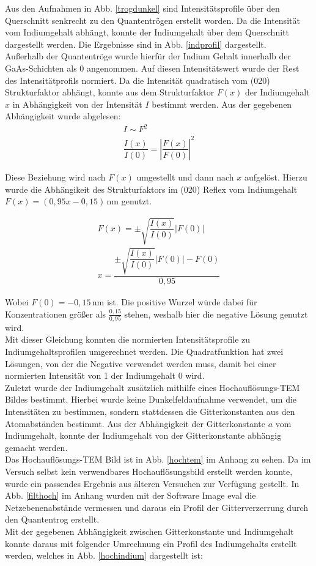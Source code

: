 \documentclass[a4paper,11pt,DIV=11]{scrartcl}
\begin{document}
Aus den Aufnahmen in Abb. \ref{trogdunkel} sind Intensitätsprofile über den Querschnitt senkrecht zu den Quantentrögen erstellt worden. Da die Intensität vom Indiumgehalt abhängt, konnte der Indiumgehalt über dem Querschnitt dargestellt werden. Die Ergebnisse sind in Abb. \ref{indprofil} dargestellt. \\
Außerhalb der Quantentröge wurde hierfür der Indium Gehalt innerhalb der GaAs-Schichten als 0 angenommen. Auf diesen Intensitätswert wurde der Rest des Intensitätprofils normiert. Da die Intensität quadratisch vom (020) Strukturfaktor abhängt, konnte aus dem Strukturfaktor $F(x)$ der Indiumgehalt $x$ in Abhängigkeit von der Intensität $I$ bestimmt werden. Aus der gegebenen Abhängigkeit wurde abgelesen:
\begin{align*}
	I \sim F^2 \\
	\dfrac{I(x)}{I(0)} = \left\vert\dfrac{F(x)}{F(0)}\right\vert^2
\end{align*}

Diese Beziehung wird nach $F(x)$ umgestellt und dann nach $x$ aufgelöst. Hierzu wurde die Abhängikeit des Strukturfaktors im (020) Reflex vom Indiumgehalt $F(x) = (0,95x - 0,15)\,\mathrm{nm}$ genutzt.

\begin{align*}
	F(x) = \pm\sqrt{\dfrac{I(x)}{I(0)}}\vert F(0) \vert \\
	x = \dfrac{\pm\sqrt{\dfrac{I(x)}{I(0)}}\vert F(0)\vert - F(0)}{0,95}
\end{align*}

Wobei $F(0) = -0,15\,\mathrm{nm}$ ist. Die positive Wurzel würde dabei für Konzentrationen größer als $\frac{0,15}{0,95}$ stehen, weshalb hier die negative Lösung genutzt wird. \\
Mit dieser Gleichung konnten die normierten Intensitätsprofile zu Indiumgehaltsprofilen umgerechnet werden. Die Quadratfunktion hat zwei Lösungen, von der die Negative verwendet werden muss, damit bei einer normierten Intensität von 1 der Indiumgehalt 0 wird. \\
Zuletzt wurde der Indiumgehalt zusätzlich mithilfe eines Hochauflösungs-TEM Bildes bestimmt. Hierbei wurde keine Dunkelfeldaufnahme verwendet, um die Intensitäten zu bestimmen, sondern stattdessen die Gitterkonstanten aus den Atomabständen bestimmt. Aus der Abhängigkeit der Gitterkonstante $a$ vom Indiumgehalt, konnte der Indiumgehalt von der Gitterkonstante abhängig gemacht werden. \\
Das Hochauflösungs-TEM Bild ist in Abb. \ref{hochtem} im Anhang zu sehen. Da im Versuch selbst kein verwendbares Hochauflösungsbild erstellt werden konnte, wurde ein passendes Ergebnis aus älteren Versuchen zur Verfügung gestellt. In Abb. \ref{filthoch} im Anhang wurden mit der Software Image eval die Netzebenenabstände vermessen und daraus ein Profil der Gitterverzerrung durch den Quantentrog erstellt. \\
Mit der gegebenen Abhängigkeit zwischen Gitterkonstante und Indiumgehalt konnte daraus mit folgender Umrechnung ein Profil des Indiumgehalts erstellt werden, welches in Abb. \ref{hochindium} dargestellt ist:
\end{document}
